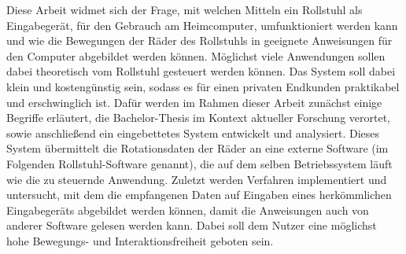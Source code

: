 Diese Arbeit widmet sich der Frage, mit welchen Mitteln ein Rollstuhl als Eingabegerät, für den Gebrauch am Heimcomputer, umfunktioniert werden kann und wie die Bewegungen der Räder des Rollstuhls in geeignete Anweisungen für den Computer abgebildet werden können.
Möglichst viele Anwendungen sollen dabei theoretisch vom Rollstuhl gesteuert werden können.
Das System soll dabei klein und kostengünstig sein, sodass es für einen privaten Endkunden praktikabel und erschwinglich ist.
Dafür werden im Rahmen dieser Arbeit zunächst einige Begriffe erläutert, die Bachelor-Thesis im Kontext aktueller Forschung verortet, sowie anschließend ein eingebettetes System entwickelt und analysiert.
Dieses System übermittelt die Rotationsdaten der Räder an eine externe Software (im Folgenden Rollstuhl-Software genannt), die auf dem selben Betriebssystem läuft wie die zu steuernde Anwendung.
Zuletzt werden Verfahren implementiert und untersucht, mit dem die empfangenen Daten auf Eingaben eines herkömmlichen Eingabegeräts abgebildet werden können, damit die Anweisungen auch von anderer Software gelesen werden kann.
Dabei soll dem Nutzer eine möglichst hohe Bewegungs- und Interaktionsfreiheit geboten sein.
